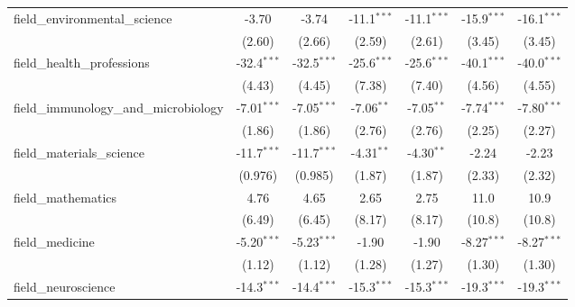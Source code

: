 \begin{tabular}{lcccccc}
   field\_environmental\_science                               & -3.70          & -3.74         & -11.1$^{***}$ & -11.1$^{***}$ & -15.9$^{***}$ & -16.1$^{***}$\\   
                                                               & (2.60)         & (2.66)        & (2.59)        & (2.61)        & (3.45)        & (3.45)\\   
   field\_health\_professions                                  & -32.4$^{***}$  & -32.5$^{***}$ & -25.6$^{***}$ & -25.6$^{***}$ & -40.1$^{***}$ & -40.0$^{***}$\\   
                                                               & (4.43)         & (4.45)        & (7.38)        & (7.40)        & (4.56)        & (4.55)\\   
   field\_immunology\_and\_microbiology                        & -7.01$^{***}$  & -7.05$^{***}$ & -7.06$^{**}$  & -7.05$^{**}$  & -7.74$^{***}$ & -7.80$^{***}$\\   
                                                               & (1.86)         & (1.86)        & (2.76)        & (2.76)        & (2.25)        & (2.27)\\   
   field\_materials\_science                                   & -11.7$^{***}$  & -11.7$^{***}$ & -4.31$^{**}$  & -4.30$^{**}$  & -2.24         & -2.23\\   
                                                               & (0.976)        & (0.985)       & (1.87)        & (1.87)        & (2.33)        & (2.32)\\   
   field\_mathematics                                          & 4.76           & 4.65          & 2.65          & 2.75          & 11.0          & 10.9\\   
                                                               & (6.49)         & (6.45)        & (8.17)        & (8.17)        & (10.8)        & (10.8)\\   
   field\_medicine                                             & -5.20$^{***}$  & -5.23$^{***}$ & -1.90         & -1.90         & -8.27$^{***}$ & -8.27$^{***}$\\   
                                                               & (1.12)         & (1.12)        & (1.28)        & (1.27)        & (1.30)        & (1.30)\\   
   field\_neuroscience                                         & -14.3$^{***}$  & -14.4$^{***}$ & -15.3$^{***}$ & -15.3$^{***}$ & -19.3$^{***}$ & -19.3$^{***}$\\   

\end{tabular}
